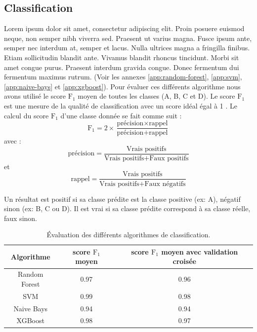 \subsection{Classification}
Lorem ipsum dolor sit amet, consectetur adipiscing elit. Proin posuere euismod neque, non semper nibh viverra sed. Praesent ut varius magna. Fusce ipsum ante, semper nec interdum at, semper et lacus. Nulla ultrices magna a fringilla finibus. Etiam sollicitudin blandit ante. Vivamus blandit rhoncus tincidunt. Morbi sit amet congue purus. Praesent interdum gravida congue. Donec fermentum dui fermentum maximus rutrum. (Voir les annexes \ref{app:random-forest}, \ref{app:svm}, \ref{app:naive-bays} et \ref{app:xgboost}). Pour évaluer ces différents algorithme nous avons utilisé le score $\text{F}_1$ moyen de toutes les classes (A, B, C et D). Le score $\text{F}_1$ est une mesure de la qualité de classification avec un score idéal égal à 1 . Le calcul du score $\text{F}_1$ d'une classe donnée se fait comme suit :
\begin{equation*}
  \text{F}_1 = 2 × \frac{\text{précision} ×  \text{rappel}}{\text{précision}+\text{rappel}}
\end{equation*}
avec :
\begin{equation*}
  \text{précision} = \frac{\text{Vrais positifs}}{\text{Vrais positifs}+\text{Faux positifs}}
\end{equation*}
et
\begin{equation*}
  \text{rappel} = \frac{\text{Vrais positifs}}{\text{Vrais positifs}+\text{Faux négatifs}}
\end{equation*}

Un résultat est positif si sa classe prédite est la classe positive (ex: A), négatif sinon (ex: B, C ou D). Il est vrai si sa classe prédite correspond à sa classe réelle, faux sinon.

\begin{table}[h!]
  \centering
  \begin{tabular}{|c|c|c|}
    \hline
    Algorithme    & score $\text{F}_1$ moyen & score $\text{F}_1$ moyen avec validation croisée \\
    \hline
    Random Forest & 0.97                     & 0.96                                             \\
    \hline
    SVM           & 0.99                     & 0.98                                             \\
    \hline
    Naive Bays    & 0.94                     & 0.94                                             \\
    \hline
    XGBoost       & 0.98                     & 0.97                                             \\
    \hline
  \end{tabular}
  \caption{Évaluation des différents algorithmes de classification.}
  \label{tab:f1-scores}
\end{table}
\FloatBarrier

